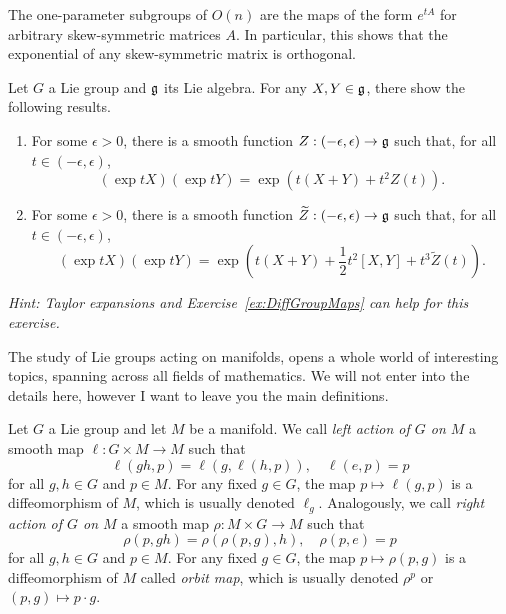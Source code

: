 \begin{exercise}
  The one-parameter subgroups of $O(n)$ are the maps of the form $e^{tA}$ for arbitrary skew-symmetric matrices $A$.
  In particular, this shows that the exponential of any skew-symmetric matrix is orthogonal.
\end{exercise}

\begin{exercise}
  Let $G$ a Lie group and $\mathfrak{g}$ its Lie algebra.
  For any $X,Y\in\mathfrak{g}$, there show the following results.
  \begin{enumerate}
    \item For some $\epsilon>0$, there is a smooth function $Z:(-\epsilon, \epsilon)\to \mathfrak{g}$  such that, for all $t\in(-\epsilon, \epsilon)$,
    \begin{equation}
      (\exp tX)(\exp tY) = \exp(t (X+Y) + t^2 Z(t)).
    \end{equation}
    \item For some $\epsilon>0$, there is a smooth function $\widetilde Z:(-\epsilon, \epsilon)\to \mathfrak{g}$ such that, for all $t\in(-\epsilon, \epsilon)$,
    \begin{equation}
      (\exp tX)(\exp tY) = \exp\left(t (X+Y) + \frac12 t^2 [X,Y] + t^3 \widetilde Z(t)\right).
    \end{equation}
  \end{enumerate}
  \textit{\small Hint: Taylor expansions and Exercise~\ref{ex:DiffGroupMaps} can help for this exercise.}
\end{exercise}

The study of Lie groups acting on manifolds, opens a whole world of interesting topics, spanning across all fields of mathematics.
We will not enter into the details here, however I want to leave you the main definitions.

\begin{definition}
  Let $G$ a Lie group and let $M$ be a manifold.
  We call \emph{left action of $G$ on $M$} a smooth map $\ell: G\times M \to M$ such that 
  \begin{equation}
    \ell(gh, p) = \ell(g,\ell(h,p)), \quad \ell(e, p) = p
  \end{equation}
  for all $g,h\in G$ and $p\in M$.
  For any fixed $g\in G$, the map $p\mapsto \ell(g,p)$ is a diffeomorphism of $M$, which is usually denoted $\ell_g$.
  Analogously, we call \emph{right action of $G$ on $M$} a smooth map $\rho: M\times G \to M$ such that 
  \begin{equation}
    \rho(p, gh) = \rho(\rho(p,g), h), \quad \rho(p, e) = p
  \end{equation}
  for all $g,h\in G$ and $p\in M$.
  For any fixed $g\in G$, the map $p\mapsto \rho(p,g)$ is a diffeomorphism of $M$ called \emph{orbit map}, which is usually denoted $\rho^p$ or $(p,g)\mapsto p\cdot g$.
\end{definition}

